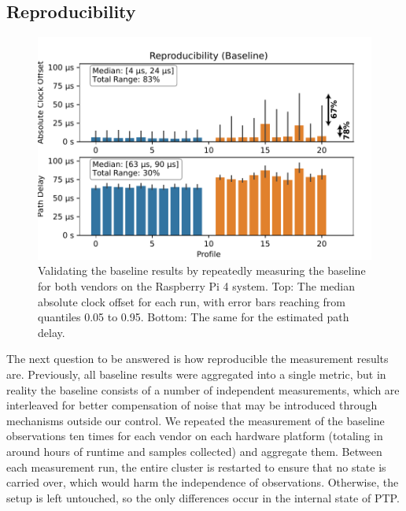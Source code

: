 \subsection{Reproducibility}
{

\renewcommand{\ptpKeyPrefix}{/reproducibility/rpi-4}


\begin{figure}
    \includegraphics[width=\linewidth]{res/generated/base/key_metric_variance.pdf}
    \caption{Validating the baseline results by repeatedly measuring the baseline for both vendors on the Raspberry Pi 4 system. Top: The median absolute clock offset for each run, with error bars reaching from quantiles 0.05 to 0.95. Bottom: The same for the estimated path delay.}
    \label{fig:baseline_reproducibility}
\end{figure}

\newcommand{\numBaselineMeasurements}{10}
\newcommand{\baselineMinutesRuntime}{\numBaselineMeasurements*4*2*20}

The next question to be answered is how reproducible the measurement results are. Previously, all baseline results were aggregated into a single metric, but in reality the baseline consists of a number of independent measurements, which are interleaved for better compensation of noise that may be introduced through mechanisms outside our control. We repeated the measurement of the baseline observations ten times for each vendor on each hardware platform (totaling in around \fpeval{round(\baselineMinutesRuntime/60)} hours of runtime and \fpeval{round(\baselineMinutesRuntime*60)} samples collected) and aggregate them. Between each measurement run, the entire cluster is restarted to ensure that no state is carried over, which would harm the independence of observations. Otherwise, the setup is left untouched, so the only differences occur in the internal state of PTP.

}
